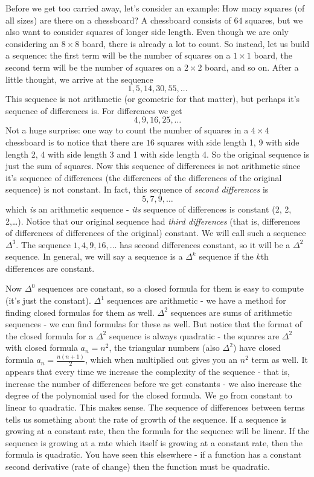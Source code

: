 \documentclass[12pt]{article}
\begin{document}
Before we get too carried away, let's consider an example: How many squares (of all sizes) are there on a chessboard?  A chessboard consists of $64$ squares, but we also want to consider squares of longer side length.  Even though we are only considering an $8 \times 8$ board, there is already a lot to count.  So instead, let us build a sequence: the first term will be the number of squares on a $1 \times 1$ board, the second term will be the number of squares on a $2 \times 2$ board, and so on.  After a little thought, we arrive at the sequence
\[1,5,14,30, 55,\ldots\]
This sequence is not arithmetic (or geometric for that matter), but perhaps it's sequence of differences is.  For differences we get
\[4, 9, 16, 25, \ldots\]
Not a huge surprise: one way to count the number of squares in a $4 \times 4$ chessboard is to notice that there are $16$ squares with side length 1, 9 with side length 2, 4 with side length 3 and 1 with side length 4.  So the original sequence is just the sum of squares.  Now this sequence of differences is not arithmetic since it's sequence of differences (the differences of the differences of the original sequence) is not constant.  In fact, this sequence of {\em second differences} is
\[5, 7, 9, \ldots\]
which {\em is} an arithmetic sequence - {\em its} sequence of differences is constant (2, 2, 2,\ldots).  Notice that our original sequence had {\em third differences} (that is, differences of differences of differences of the original) constant.  We will call such a sequence $\Delta^3$.  The sequence $1, 4, 9, 16, \ldots$ has second differences constant, so it will be a $\Delta^2$ sequence. In general, we will say a sequence is a $\Delta^k$ sequence if the $k$th differences are constant.

Now $\Delta^0$ sequences are constant, so a closed formula for them is easy to compute (it's just the constant). $\Delta^1$ sequences are arithmetic - we have a method for finding closed formulas for them as well.  $\Delta^2$ sequences are sums of arithmetic sequences - we can find formulas for these as well.  But notice that the format of the closed formula for a $\Delta^2$ sequence is always quadratic - the squares are $\Delta^2$ with closed formula $a_n= n^2$, the triangular numbers (also $\Delta^2$) have closed formula $a_n = \frac{n(n+1)}{2}$, which when multiplied out gives you an $n^2$ term as well.  It appears that every time we increase the complexity of the sequence - that is, increase the number of differences before we get constants - we also increase the degree of the polynomial used for the closed formula.  We go from constant to linear to quadratic.  This makes sense.  The sequence of differences between terms tells us something about the rate of growth of the sequence.  If a sequence is growing at a constant rate, then the formula for the sequence will be linear.  If the sequence is growing at a rate which itself is growing at a constant rate, then the formula is quadratic.  You have seen this elsewhere - if a function has a constant second derivative (rate of change) then the function must be quadratic.
\end{document}
